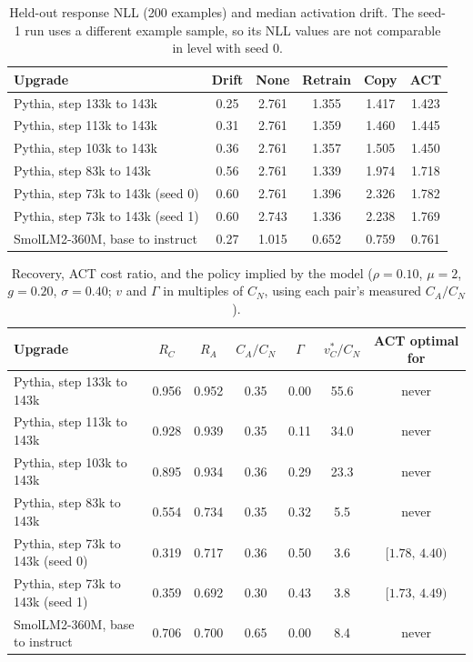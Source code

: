 \documentclass[ijoc,nonblindrev]{informs4}
\begin{document}
\begin{table}[t]
\centering
\caption{Held-out response NLL (200 examples) and median activation drift. The seed-1 run uses a different example sample, so its NLL values are not comparable in level with seed 0.}\label{tab:nll}
\begin{tabular}{lccccc}
\toprule
Upgrade & Drift & None & Retrain & Copy & ACT\\
\midrule
Pythia, step 133k to 143k & 0.25 & 2.761 & 1.355 & 1.417 & 1.423\\
Pythia, step 113k to 143k & 0.31 & 2.761 & 1.359 & 1.460 & 1.445\\
Pythia, step 103k to 143k & 0.36 & 2.761 & 1.357 & 1.505 & 1.450\\
Pythia, step 83k to 143k & 0.56 & 2.761 & 1.339 & 1.974 & 1.718\\
Pythia, step 73k to 143k (seed 0) & 0.60 & 2.761 & 1.396 & 2.326 & 1.782\\
Pythia, step 73k to 143k (seed 1) & 0.60 & 2.743 & 1.336 & 2.238 & 1.769\\
SmolLM2-360M, base to instruct & 0.27 & 1.015 & 0.652 & 0.759 & 0.761\\
\bottomrule
\end{tabular}
\end{table}

\begin{table}[t]
\centering
\caption{Recovery, ACT cost ratio, and the policy implied by the model ($\rho=0.10$, $\mu=2$, $g=0.20$, $\sigma=0.40$; $v$ and $\Gamma$ in multiples of $C_N$, using each pair's measured $C_A/C_N$).}\label{tab:pairs}
\begin{tabular}{lcccccc}
\toprule
Upgrade & $R_C$ & $R_A$ & $C_A/C_N$ & $\Gamma$ & $v^*_C/C_N$ & ACT optimal for\\
\midrule
Pythia, step 133k to 143k & 0.956 & 0.952 & 0.35 & 0.00 & 55.6 & never\\
Pythia, step 113k to 143k & 0.928 & 0.939 & 0.35 & 0.11 & 34.0 & never\\
Pythia, step 103k to 143k & 0.895 & 0.934 & 0.36 & 0.29 & 23.3 & never\\
Pythia, step 83k to 143k & 0.554 & 0.734 & 0.35 & 0.32 & 5.5 & never\\
Pythia, step 73k to 143k (seed 0) & 0.319 & 0.717 & 0.36 & 0.50 & 3.6 & $[1.78,\,4.40)$\\
Pythia, step 73k to 143k (seed 1) & 0.359 & 0.692 & 0.30 & 0.43 & 3.8 & $[1.73,\,4.49)$\\
SmolLM2-360M, base to instruct & 0.706 & 0.700 & 0.65 & 0.00 & 8.4 & never\\
\bottomrule
\end{tabular}
\end{table}
\end{document}
